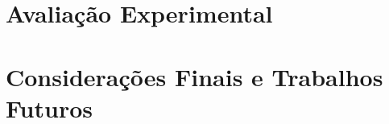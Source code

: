 \documentclass[
    12pt,       %
    oneside,    %
    a4paper,    %
%
    chapter=TITLE,	  	  %
%
    english,			  %
    brazil				  %
%
]{abntex2}
\begin{document}
\chapter{Avaliação Experimental}\label{ch:resultados}


\chapter{Considerações Finais e Trabalhos Futuros}\label{ch:consideracoes}


% 

%
\renewcommand{\bibname}{Referências}



\printindex
\end{document}
